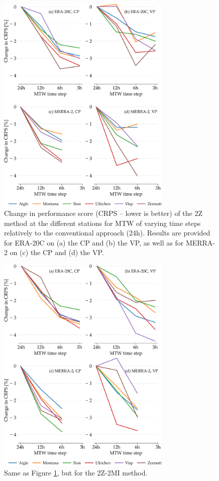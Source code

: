 \documentclass[hess, manuscript]{copernicus}
\begin{document}
	\begin{figure}[htb]
		\includegraphics[width=8.3cm]{fig09.pdf}
		\caption{Change in performance score (CRPS -- lower is better) of the 2Z method at the different stations for MTW of varying time steps relatively to the conventional approach (24h). Results are provided for ERA-20C on (a) the CP and (b) the VP, as well as for MERRA-2 on (c) the CP and (d) the VP.}
		\label{fig:plots_CRPS_2Z}
	\end{figure}
	
	\begin{figure}[htb]
		\includegraphics[width=8.3cm]{fig10.pdf}
		\caption{Same as Figure \ref{fig:plots_CRPS_2Z}, but for the 2Z-2MI method.}
		\label{fig:plots_CRPS_2Z-2MI}
	\end{figure}
	
\end{document}
